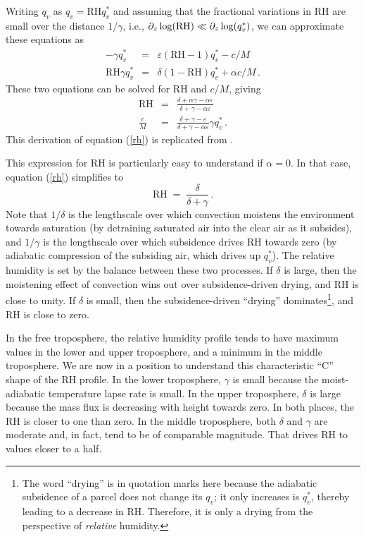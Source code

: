 \documentclass[12pt]{article}
\begin{document}
Writing $q_v$ as $q_v = \text{RH} q_v^*$ and assuming that the fractional variations in RH are small over the distance $1/\gamma$, i.e., $\partial_z \log(\text{RH}) \ll \partial_z \log(q_v^*)$, we can approximate these equations as
\begin{eqnarray}
-\gamma q_v^* &=& \varepsilon (\text{RH} - 1) q_v^* - c/M \label{bpc_2} \\
\text{RH} \gamma q_v^* &=& \delta (1 - \text{RH}) q_v^* + \alpha c/M \, . \label{bpe_2} 
\end{eqnarray}
These two equations can be solved for RH and $c/M$, giving
\begin{eqnarray}
\text{RH} &=& \frac{\delta + \alpha \gamma - \alpha \varepsilon}{\delta + \gamma - \alpha \varepsilon} \label{rh} \\
\frac{c}{M} &=& \frac{\delta + \gamma - \varepsilon}{\delta + \gamma - \alpha \varepsilon} \gamma q_v^* \, . \label{cond}
\end{eqnarray}
This derivation of equation (\ref{rh}) is replicated from \citet{13lapse}.


This expression for RH is particularly easy to understand if $\alpha=0$.  In that case, equation (\ref{rh}) simplifies to
\begin{equation}
\text{RH} \; = \; \frac{\delta}{\delta + \gamma} \, . \label{rh_ito_gamma_delta}
\end{equation}
Note that $1/\delta$ is the lengthscale over which convection moistens the environment towards saturation (by detraining saturated air into the clear air as it subsides), and $1/\gamma$ is the lengthscale over which subsidence drives RH towards zero (by adiabatic compression of the subsiding air, which drives up $q_v^*$).  The relative humidity is set by the balance between these two processes.  If $\delta$ is large, then the moistening effect of convection wins out over subsidence-driven drying, and RH is close to unity.  If $\delta$ is small, then the subsidence-driven ``drying'' dominates\footnote{The word ``drying'' is in quotation marks here because the adiabatic subsidence of a parcel does not change its $q_v$; it only increases is $q_v^*$, thereby leading to a decrease in RH.  Therefore, it is only a drying from the perspective of {\it relative} humidity.}, and RH is close to zero.


In the free troposphere, the relative humidity profile tends to have maximum values in the lower and upper troposphere, and a minimum in the middle troposphere.  We are now in a position to understand this characteristic ``C'' shape of the RH profile.  In the lower troposphere, $\gamma$ is small because the moist-adiabatic temperature lapse rate is small.  In the upper troposphere, $\delta$ is large because the mass flux is decreasing with height towards zero.  In both places, the RH is closer to one than zero.  In the middle troposphere, both $\delta$ and $\gamma$ are moderate and, in fact, tend to be of comparable magnitude.  That drives RH to values closer to a half.
\end{document}
